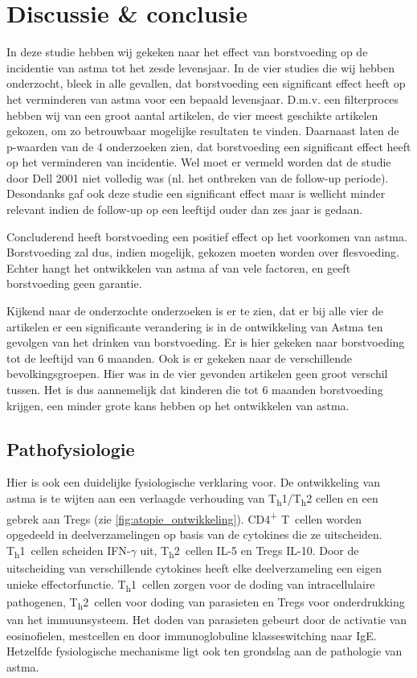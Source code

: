 \documentclass[abstract=true]{scrartcl}
\begin{document}
\section{Discussie \& conclusie}
In deze studie hebben wij gekeken naar het effect van borstvoeding op de incidentie van astma tot het zesde levensjaar. In de vier studies die wij hebben onderzocht, bleek in alle gevallen, dat borstvoeding een significant effect heeft op het verminderen van astma voor een bepaald levensjaar. 
D.m.v. een filterproces hebben wij van een groot aantal artikelen, de vier meest geschikte artikelen gekozen, om zo betrouwbaar mogelijke resultaten te vinden. Daarnaast laten de p-waarden van de 4 onderzoeken zien, dat borstvoeding een significant effect heeft op het verminderen van incidentie. 
Wel moet er vermeld worden dat de studie door Dell 2001 niet volledig was (nl. het ontbreken van de follow-up periode). Desondanks gaf ook deze studie een significant effect maar is wellicht minder relevant indien de follow-up op een leeftijd ouder dan zes jaar is gedaan. 

Concluderend heeft borstvoeding een positief effect op het voorkomen van astma. Borstvoeding zal dus, indien mogelijk, gekozen moeten worden over flesvoeding. Echter hangt het ontwikkelen van astma af van vele factoren, en geeft borstvoeding geen garantie. 


Kijkend naar de onderzochte onderzoeken is er te zien, dat er bij alle vier de artikelen er een significante verandering is in de ontwikkeling van Astma ten gevolgen van het drinken van borstvoeding. Er is hier gekeken naar borstvoeding tot de leeftijd van 6 maanden. Ook is er gekeken naar de verschillende bevolkingsgroepen. Hier was in de vier gevonden artikelen geen groot verschil tussen. Het is dus aannemelijk dat kinderen die tot 6 maanden borstvoeding krijgen, een minder grote kans hebben op het ontwikkelen van astma.


\subsection{Pathofysiologie}
Hier is ook een duidelijke fysiologische verklaring voor.
De ontwikkeling van astma is te wijten aan een verlaagde verhouding van T\textsubscript{h}1/T\textsubscript{h}2 cellen en een gebrek aan Tregs (zie \cref{fig:atopie_ontwikkeling}). CD4\textsuperscript{+} T~cellen worden opgedeeld in deelverzamelingen op basis van de cytokines die ze uitscheiden. T\textsubscript{h}1~cellen scheiden IFN-$\gamma$ uit, T\textsubscript{h}2~cellen IL-5 en Tregs IL-10. Door de uitscheiding van verschillende cytokines heeft elke deelverzameling een eigen unieke effectorfunctie. T\textsubscript{h}1~cellen zorgen voor de doding van intracellulaire pathogenen, T\textsubscript{h}2~cellen voor doding van parasieten en Tregs voor onderdrukking van het immuunsysteem. Het doden van parasieten gebeurt door de activatie van eosinofielen, mestcellen en door immunoglobuline klasseswitching naar IgE. Hetzelfde fysiologische mechanisme ligt ook ten grondslag aan de pathologie van astma.
\end{document}
